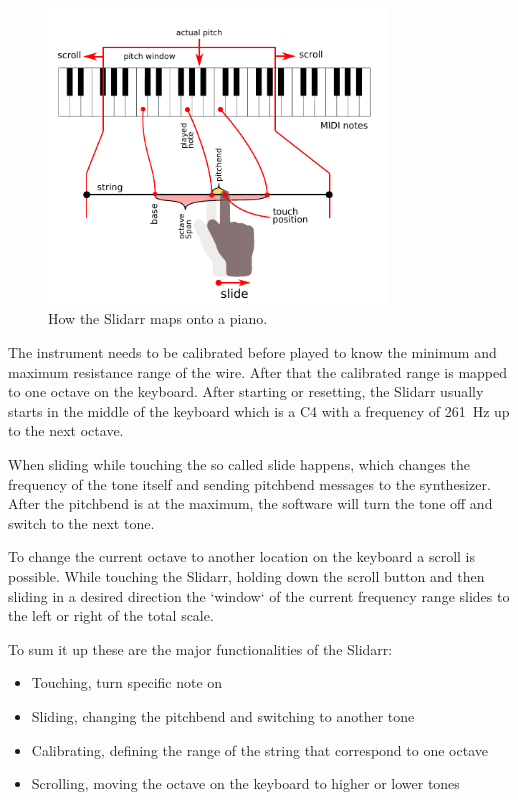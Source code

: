 \documentclass{article}
\begin{document}
\begin{figure}[ht]
  \centering
  \includegraphics[width=0.8\textwidth]{slidar_illustration}
  \caption{How the Slidarr maps onto a piano.}
  \label{fig:slidarr}
\end{figure}


The instrument needs to be calibrated before played to know the minimum and maximum resistance range of the wire. After that the calibrated range is mapped to one octave on the keyboard. After starting or resetting, the Slidarr usually starts in the middle of the keyboard which is a C4 with a frequency of \SI{261}{\hertz} up to the next octave.

When sliding while touching the so called slide happens, which changes the frequency of the tone itself and sending pitchbend messages to the synthesizer. After the pitchbend is at the maximum, the software will turn the tone off and switch to the next tone.

To change the current octave to another location on the keyboard a scroll is possible. While touching the Slidarr, holding down the scroll button and then sliding in a desired direction the `window` of the current frequency range slides to the left or right of the total scale.

To sum it up these are the major functionalities of the Slidarr:
\begin{itemize}
 \item Touching, turn specific note on
 \item Sliding, changing the pitchbend and switching to another tone
 \item Calibrating, defining the range of the string that correspond to one octave
 \item Scrolling, moving the octave on the keyboard to higher or lower tones
\end{itemize}
\end{document}
